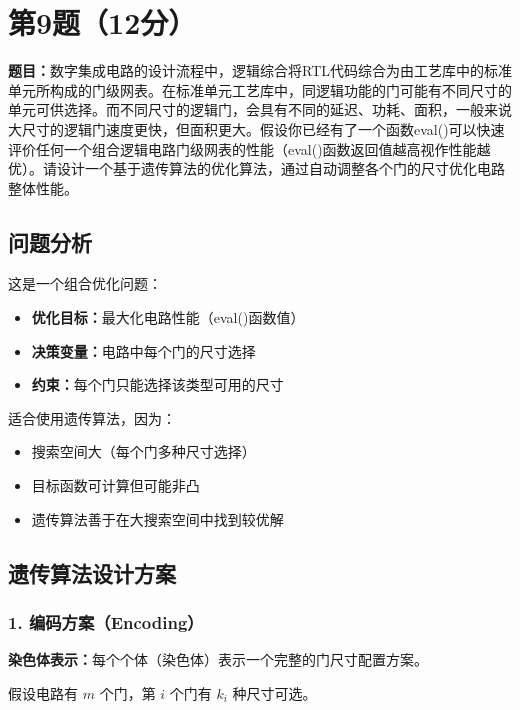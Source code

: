 \documentclass[UTF8,12pt,a4paper]{ctexart}
\begin{document}
\section*{第9题（12分）}
\textbf{题目：}数字集成电路的设计流程中，逻辑综合将RTL代码综合为由工艺库中的标准单元所构成的门级网表。在标准单元工艺库中，同逻辑功能的门可能有不同尺寸的单元可供选择。而不同尺寸的逻辑门，会具有不同的延迟、功耗、面积，一般来说大尺寸的逻辑门速度更快，但面积更大。假设你已经有了一个函数eval()可以快速评价任何一个组合逻辑电路门级网表的性能（eval()函数返回值越高视作性能越优）。请设计一个基于遗传算法的优化算法，通过自动调整各个门的尺寸优化电路整体性能。

\subsection*{问题分析}

这是一个组合优化问题：
\begin{itemize}
	\item \textbf{优化目标：}最大化电路性能（eval()函数值）
	\item \textbf{决策变量：}电路中每个门的尺寸选择
	\item \textbf{约束：}每个门只能选择该类型可用的尺寸
\end{itemize}

适合使用遗传算法，因为：
\begin{itemize}
	\item 搜索空间大（每个门多种尺寸选择）
	\item 目标函数可计算但可能非凸
	\item 遗传算法善于在大搜索空间中找到较优解
\end{itemize}

\subsection*{遗传算法设计方案}

\subsubsection*{1. 编码方案（Encoding）}

\textbf{染色体表示：}每个个体（染色体）表示一个完整的门尺寸配置方案。

假设电路有 $m$ 个门，第 $i$ 个门有 $k_i$ 种尺寸可选。
\end{document}
